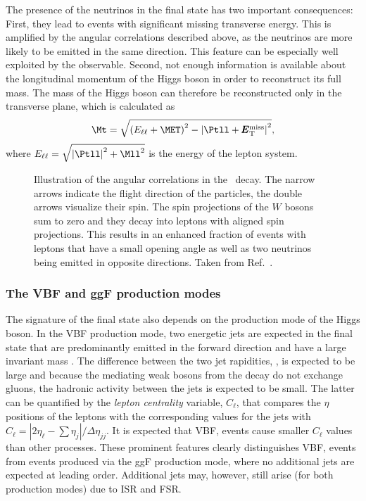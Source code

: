 The presence of the neutrinos in the final state has two important consequences:
First, they lead to events with significant missing transverse energy. This is amplified by the angular correlations described above, as the neutrinos are more likely to be emitted in the same direction. This feature can be especially well exploited by the \METSig observable.
Second, not enough information is available about the longitudinal momentum of the Higgs boson in order to reconstruct its full mass. The mass of the Higgs boson can therefore be reconstructed only in the transverse plane, which is calculated as
\begin{equation}
  \Mt = \sqrt{ \left( E_{\ell\ell}+\MET \right)^2 - \left| \Ptll + \pmb{E}_{\text{T}}^{\text{miss}} \right|^2 },
\end{equation}
where $E_{\ell\ell} = \sqrt{ \left|\Ptll\right|^2 + \Mll^2}$ is the energy of the lepton system.
\begin{figure}
    \caption[Angular correlations in the \HWWdet\ decay.]{Illustration of the angular correlations in the \HWWdet\ decay. The narrow arrows indicate the flight direction of the particles, the double arrows visualize their spin. The spin projections of the $W$ bosons sum to zero and they decay into leptons with aligned spin projections. This results in an enhanced fraction of events with leptons that have a small opening angle as well as two neutrinos being emitted in opposite directions. Taken from Ref.~\cite{HIGG-2013-13}.}
    \label{fig:spin-correlations}
\end{figure}

\subsubsection{The VBF and ggF production modes}
The signature of the final state also depends on the production mode of the Higgs boson.
In the VBF production mode, two energetic jets are expected in the final state that are predominantly emitted in the forward direction and have a large invariant mass \mjj. 
The difference between the two jet rapidities, \dyjj, is expected to be large and because the mediating weak bosons from the \HWW decay do not exchange gluons, the hadronic activity between the jets is expected to be small. 
The latter can be quantified by the \emph{lepton centrality} variable, $C_\ell$, that compares the $\eta$ positions of the leptons with the corresponding values for the jets with $C_\ell = |2\eta_\ell - \sum \eta_j| / \Delta \eta_{jj}$. It is expected that VBF, \HWW events cause smaller $C_\ell$ values than other processes.
These prominent features clearly distinguishes VBF, \HWW events from events produced via the ggF production mode, where no additional jets are expected at leading order. Additional jets may, however, still arise (for both production modes) due to ISR and FSR. 

